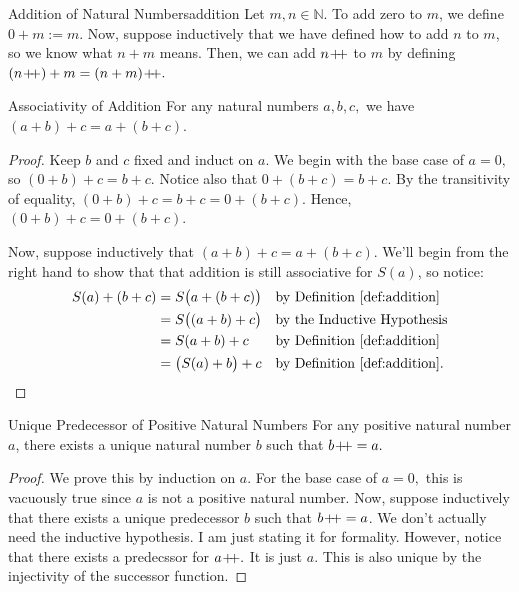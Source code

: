 \begin{definition}{Addition of Natural Numbers}{addition}
    Let $m, n \in \mathbb{N}.$ 
    To add zero to $m$, we define $0 + m := m.$
    Now, suppose inductively that we have defined how to add $n$ to $m$, so we know what $n + m$ means.
    Then, we can add $n \! +\!\!\!+$ to $m$ by defining $(\successor{n}) + m = \successor{(n + m)}.$
\end{definition}

\begin{problem}{Associativity of Addition}
    For any natural numbers $a, b, c,$ we have $(a + b) + c = a + (b + c).$
\end{problem}
\begin{proof}
    Keep $b$ and $c$ fixed and induct on $a$. 
    We begin with the base case of $a = 0,$ so $(0 + b) + c = b + c.$ 
    Notice also that $0 + (b + c) = b +c.$
    By the transitivity of equality, $(0 + b) + c = b + c = 0 + (b+ c).$
    Hence, $(0 + b) + c = 0 + (b + c).$

    Now, suppose inductively that $(a + b) + c = a + (b + c).$ 
    We'll begin from the right hand to show that that addition is still associative for $S(a)$, so notice:
    \begin{align*}
        S(a) + (b + c) &= S\big(a + (b +c) \big) &&\text{by Definition~\ref{def:addition}}\\
        &= S\big((a + b) + c\big) &&\text{by the Inductive Hypothesis}\\
        &= S(a + b) + c &&\text{by Definition~\ref{def:addition}}\\
        &= \big(S(a) + b \big) + c&&\text{by Definition~\ref{def:addition}}.
    \end{align*}
\end{proof}

\begin{problem}{Unique Predecessor of Positive Natural Numbers}
    For any positive natural number $a$, there exists a unique natural number $b$ such that $b \! +\!\!\!+ = a.$
\end{problem}
\begin{proof}
    We prove this by induction on $a$. 
    For the base case of $a = 0,$ this is vacuously true since $a$ is not a positive natural number.
    Now, suppose inductively that there exists a unique predecessor $b$ such that $b \! +\!\!\!+ = a$.
    We don't actually need the inductive hypothesis. I am just stating it for formality.
    However, notice that there exists a predecssor for $a \! +\!\!\!+.$
    It is just $a$. 
    This is also unique by the injectivity of the successor function. 
\end{proof}

